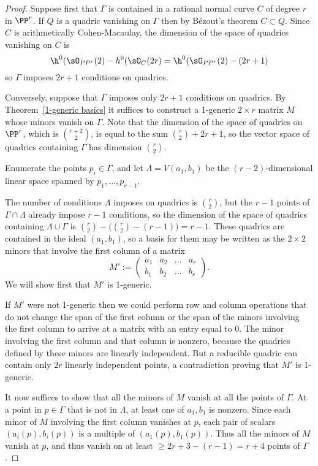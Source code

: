 \begin{proof} Suppose first that $\Gamma$ is contained in a rational normal curve $C$ of degree $r$ in $\PP^{r}$.
If $Q$ is a quadric vanishing on $\Gamma$ then by B\'ezout's theorem $C\subset Q$. Since $C$ is arithmetically
Cohen-Macaulay, the dimension of the space of quadrics vanishing on $C$ is 
$$
\h^{0}(\sO_{PP^{r}}(2) - h^{0}(\sO_{C}(2r) = \h^{0}(\sO_{PP^{r}}(2) -(2r+1)
$$
so $\Gamma$ imposes $2r+1$ conditions on quadrics.

Conversely, suppose that $\Gamma$ imposes only $2r+1$ conditions on quadrics.
By Theorem~\ref{1-generic basics} it suffices to construct a 1-generic $2\times r$ matrix $M$ whose minors vanish on
$\Gamma$. Note that the dimension of the space of quadrics on $\PP^r$, which is $\binom{r+2}{2}$, is equal to the sum
$\binom{r}{2}+2r+1$, so the vector space of quadrics containing $\Gamma$ has dimension $\binom{r}{2}$.

Enumerate the points $p_i\in \Gamma$, and let $\Lambda = V(a_1,b_1)$ be the $(r-2)$-dimensional linear
space spanned by $p_1,\dots,p_{r-1}$. 

 The number of
conditions $\Lambda$ imposes on quadrics is $\binom{r}{2}$, but the $r-1$ points of $\Gamma \cap \Lambda$
already impose $r-1$ conditions, so the dimension of the space of quadrics containing $\Lambda\cup \Gamma$
is $\binom{r}{2}-\bigl(\binom{r}{2}-(r-1)\bigr) = r-1.$ These quadrics are contained in the ideal $(a_1,b_1)$, so a
basis for them
may be written as the $2\times 2$ minors that involve the first column of a matrix
$$
M' := \begin{pmatrix}
a_1&a_2&\dots&a_{r}\\
b_1&b_2&\dots&b_{r}
\end{pmatrix}.
$$
We will show first that $M'$ is 1-generic.

If $M'$ were not 1-generic then we could perform row and column operations that do not change the 
span of the first column or the span of the minors involving the first column
 to arrive at a matrix with an entry equal to 0. The minor
involving the first column and that column is nonzero, because the quadrics defined by
these minors are linearly independent. But a reducible quadric can contain
only $2r$ linearly independent points, a contradiction proving that $M'$ is 1-generic.

It now suffices to show that all the minors of $M$ vanish at all the points of $\Gamma$.
At a point in $p\in \Gamma$ that is not in $\Lambda$, at least one of $a_1,b_1$ is nonzero.
Since each minor
of $M$ involving the first column vanishes at $p$, each pair
of scalars $(a_i(p),b_i(p))$ is a multiple of $(a_1(p), b_1(p))$. Thus all the minors
of $M$ vanish at $p$, and thus vanish on at least $\geq 2r+3-(r-1) = r+4$ points of $\Gamma$.


\end{proof}
